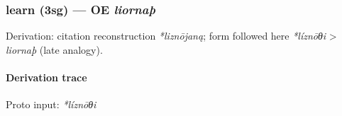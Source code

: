 \documentclass[
  british,
  a4paper,
]{article}
\begin{document}
\subsubsection{\texorpdfstring{learn (3sg) --- OE
\emph{liornaþ}}{learn (3sg) --- OE liornaþ}}\label{learn-3sg-oe-liornauxfe}

Derivation: citation reconstruction \emph{*liznōjaną}; form followed
here \emph{*líznōθi} \textgreater{} \emph{liornaþ} (late analogy).

\paragraph{Derivation trace}\label{derivation-trace-145}

Proto input: \emph{*líznōθi}

\begingroup
\setlength{\fboxsep}{6pt}
\end{document}
